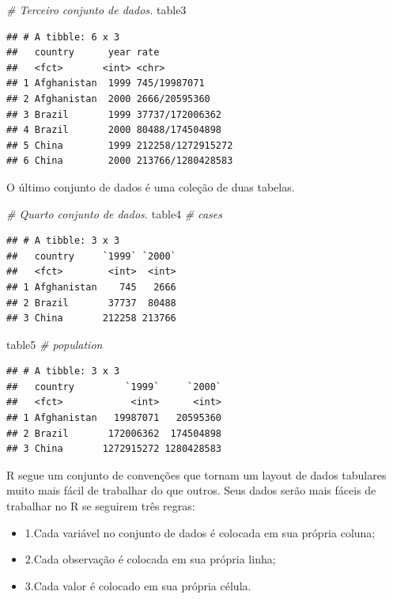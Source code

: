 \documentclass[]{book}
\newenvironment{Shaded}{\begin{snugshade}}{\end{snugshade}}
\newcommand{\CommentTok}[1]{\textcolor[rgb]{0.56,0.35,0.01}{\textit{#1}}}
\newcommand{\NormalTok}[1]{#1}
\providecommand{\tightlist}{%
  \setlength{\itemsep}{0pt}\setlength{\parskip}{0pt}}
\begin{document}
\begin{Shaded}
\begin{Highlighting}[]
\CommentTok{# Terceiro conjunto de dados.}
\NormalTok{table3}
\end{Highlighting}
\end{Shaded}

\begin{verbatim}
## # A tibble: 6 x 3
##   country      year rate             
##   <fct>       <int> <chr>            
## 1 Afghanistan  1999 745/19987071     
## 2 Afghanistan  2000 2666/20595360    
## 3 Brazil       1999 37737/172006362  
## 4 Brazil       2000 80488/174504898  
## 5 China        1999 212258/1272915272
## 6 China        2000 213766/1280428583
\end{verbatim}

O último conjunto de dados é uma coleção de duas tabelas.

\begin{Shaded}
\begin{Highlighting}[]
\CommentTok{# Quarto conjunto de dados.}
\NormalTok{table4 }\CommentTok{# cases}
\end{Highlighting}
\end{Shaded}

\begin{verbatim}
## # A tibble: 3 x 3
##   country     `1999` `2000`
##   <fct>        <int>  <int>
## 1 Afghanistan    745   2666
## 2 Brazil       37737  80488
## 3 China       212258 213766
\end{verbatim}

\begin{Shaded}
\begin{Highlighting}[]
\NormalTok{table5 }\CommentTok{# population}
\end{Highlighting}
\end{Shaded}

\begin{verbatim}
## # A tibble: 3 x 3
##   country         `1999`     `2000`
##   <fct>            <int>      <int>
## 1 Afghanistan   19987071   20595360
## 2 Brazil       172006362  174504898
## 3 China       1272915272 1280428583
\end{verbatim}

R segue um conjunto de convenções que tornam um layout de dados tabulares muito mais fácil de trabalhar do que outros. Seus dados serão mais fáceis de trabalhar no R se seguirem três regras:

\begin{itemize}
\tightlist
\item
  1.Cada variável no conjunto de dados é colocada em sua própria coluna;
\item
  2.Cada observação é colocada em sua própria linha;
\item
  3.Cada valor é colocado em sua própria célula.
\end{itemize}
\end{document}
